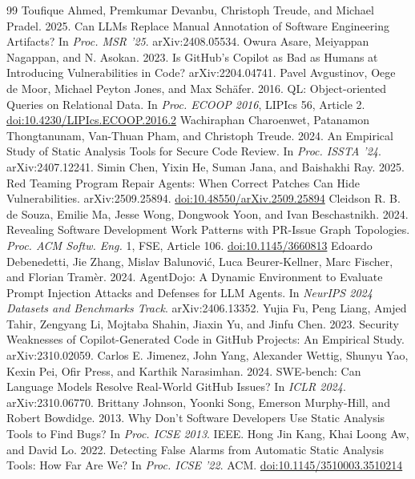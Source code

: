 \documentclass[acmsmall,screen,nonacm]{acmart}
\providecommand{\doi}[1]{\href{https://doi.org/#1}{doi:#1}}
\begin{document}
\clearpage
\raggedbottom
\begingroup
\begin{thebibliography}{99}
\fontsize{8}{9}\selectfont
\setlength{\itemsep}{0pt}
\setlength{\parsep}{0pt}
\setlength{\parskip}{0pt}
 Toufique Ahmed, Premkumar Devanbu, Christoph Treude, and Michael Pradel. 2025. Can LLMs Replace Manual Annotation of Software Engineering Artifacts? In \emph{Proc. MSR '25}. arXiv:2408.05534.
 Owura Asare, Meiyappan Nagappan, and N. Asokan. 2023. Is GitHub's Copilot as Bad as Humans at Introducing Vulnerabilities in Code? arXiv:2204.04741.
 Pavel Avgustinov, Oege de Moor, Michael Peyton Jones, and Max Sch\"afer. 2016. QL: Object-oriented Queries on Relational Data. In \emph{Proc. ECOOP 2016}, LIPIcs 56, Article 2. \doi{10.4230/LIPIcs.ECOOP.2016.2}
 Wachiraphan Charoenwet, Patanamon Thongtanunam, Van-Thuan Pham, and Christoph Treude. 2024. An Empirical Study of Static Analysis Tools for Secure Code Review. In \emph{Proc. ISSTA '24}. arXiv:2407.12241.
 Simin Chen, Yixin He, Suman Jana, and Baishakhi Ray. 2025. Red Teaming Program Repair Agents: When Correct Patches Can Hide Vulnerabilities. arXiv:2509.25894. \doi{10.48550/arXiv.2509.25894}
 Cleidson R. B. de Souza, Emilie Ma, Jesse Wong, Dongwook Yoon, and Ivan Beschastnikh. 2024. Revealing Software Development Work Patterns with PR-Issue Graph Topologies. \emph{Proc. ACM Softw. Eng.} 1, FSE, Article 106. \doi{10.1145/3660813}
 Edoardo Debenedetti, Jie Zhang, Mislav Balunovi\'c, Luca Beurer-Kellner, Marc Fischer, and Florian Tram\`er. 2024. AgentDojo: A Dynamic Environment to Evaluate Prompt Injection Attacks and Defenses for LLM Agents. In \emph{NeurIPS 2024 Datasets and Benchmarks Track}. arXiv:2406.13352.
 Yujia Fu, Peng Liang, Amjed Tahir, Zengyang Li, Mojtaba Shahin, Jiaxin Yu, and Jinfu Chen. 2023. Security Weaknesses of Copilot-Generated Code in GitHub Projects: An Empirical Study. arXiv:2310.02059.
 Carlos E. Jimenez, John Yang, Alexander Wettig, Shunyu Yao, Kexin Pei, Ofir Press, and Karthik Narasimhan. 2024. SWE-bench: Can Language Models Resolve Real-World GitHub Issues? In \emph{ICLR 2024}. arXiv:2310.06770.
 Brittany Johnson, Yoonki Song, Emerson Murphy-Hill, and Robert Bowdidge. 2013. Why Don't Software Developers Use Static Analysis Tools to Find Bugs? In \emph{Proc. ICSE 2013}. IEEE.
 Hong Jin Kang, Khai Loong Aw, and David Lo. 2022. Detecting False Alarms from Automatic Static Analysis Tools: How Far Are We? In \emph{Proc. ICSE '22}. ACM. \doi{10.1145/3510003.3510214}

\end{thebibliography}
\end{document}
